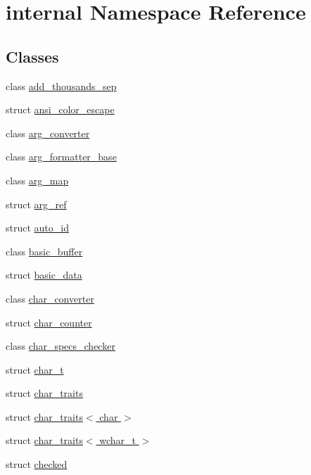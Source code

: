 \hypertarget{namespaceinternal}{}\section{internal Namespace Reference}
\label{namespaceinternal}
\subsection*{Classes}
\begin{DoxyCompactItemize}
\item 
class \hyperlink{classinternal_1_1add__thousands__sep}{add\+\_\+thousands\+\_\+sep}
\item 
struct \hyperlink{structinternal_1_1ansi__color__escape}{ansi\+\_\+color\+\_\+escape}
\item 
class \hyperlink{classinternal_1_1arg__converter}{arg\+\_\+converter}
\item 
class \hyperlink{classinternal_1_1arg__formatter__base}{arg\+\_\+formatter\+\_\+base}
\item 
class \hyperlink{classinternal_1_1arg__map}{arg\+\_\+map}
\item 
struct \hyperlink{structinternal_1_1arg__ref}{arg\+\_\+ref}
\item 
struct \hyperlink{structinternal_1_1auto__id}{auto\+\_\+id}
\item 
class \hyperlink{classinternal_1_1basic__buffer}{basic\+\_\+buffer}
\item 
struct \hyperlink{structinternal_1_1basic__data}{basic\+\_\+data}
\item 
class \hyperlink{classinternal_1_1char__converter}{char\+\_\+converter}
\item 
struct \hyperlink{structinternal_1_1char__counter}{char\+\_\+counter}
\item 
class \hyperlink{classinternal_1_1char__specs__checker}{char\+\_\+specs\+\_\+checker}
\item 
struct \hyperlink{structinternal_1_1char__t}{char\+\_\+t}
\item 
struct \hyperlink{structinternal_1_1char__traits}{char\+\_\+traits}
\item 
struct \hyperlink{structinternal_1_1char__traits_3_01char_01_4}{char\+\_\+traits$<$ char $>$}
\item 
struct \hyperlink{structinternal_1_1char__traits_3_01wchar__t_01_4}{char\+\_\+traits$<$ wchar\+\_\+t $>$}
\item 
struct \hyperlink{structinternal_1_1checked}{checked}
\item 

\end{DoxyCompactItemize}
